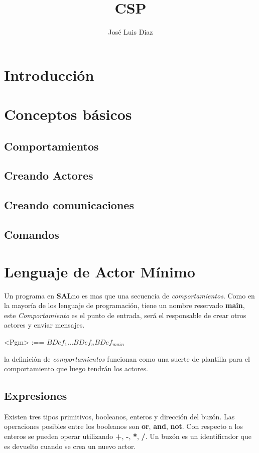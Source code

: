 \documentclass[fleqn]{article}
\title{CSP}
\author{José Luis Diaz}
\date{ }
\newcommand{\SAL}{\textbf{SAL}}
\begin{document}
 
\maketitle
 
\tableofcontents
 
\section{Introducción}

\section{Conceptos básicos}

\subsection*{Comportamientos}

\subsection*{Creando Actores}

\subsection*{Creando comunicaciones}

\subsection*{Comandos}

\section{Lenguaje de Actor Mínimo}

Un programa en \SAL no es mas que una secuencia de \textit{comportamientos}.
Como en la mayoría de los lenguaje de programación, tiene un nombre reservado
\textbf{main}, este \textit{Comportamiento} es el punto de entrada, será el
responsable de crear otros actores y enviar mensajes.

\begin{grammar}
   <Pgm> :== $BDef_1 ... BDef_n BDef_{main} $ 
\end{grammar}

la definición de \textit{comportamientos} funcionan como una suerte de plantilla
para el comportamiento que luego tendrán los actores. 

\subsection{Expresiones}
Existen tres tipos primitivos, booleanos, enteros y dirección del buzón. Las operaciones
posibles entre los booleanos son \textbf{or}, \textbf{and}, \textbf{not}. Con
respecto a los enteros se pueden operar utilizando \textbf{+}, \textbf{-},
\textbf{*}, \textbf{/}. Un buzón es un identificador que es devuelto cuando se
crea un nuevo actor.
\end{document}
